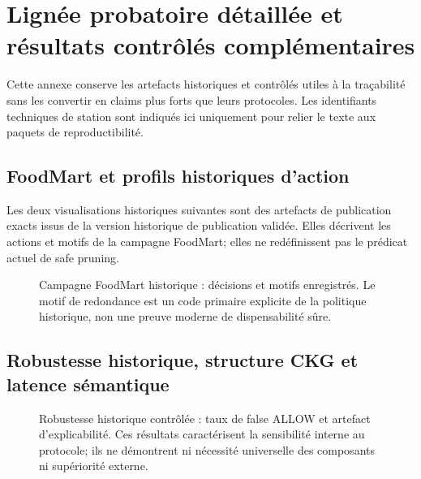 \section{Lignée probatoire détaillée et résultats contrôlés complémentaires}
\label{app:evidence-lineage}

Cette annexe conserve les artefacts historiques et contrôlés utiles à la traçabilité sans les convertir en claims plus forts que leurs protocoles. Les identifiants techniques de station sont indiqués ici uniquement pour relier le texte aux paquets de reproductibilité.

\subsection{FoodMart et profils historiques d'action}

Les deux visualisations historiques suivantes sont des artefacts de publication exacts issus de la version historique de publication validée. Elles décrivent les actions et motifs de la campagne FoodMart; elles ne redéfinissent pas le prédicat actuel de safe pruning.

\begin{figure}[!t]
\centering
\begin{minipage}[t]{0.48\textwidth}\centering\end{minipage}\hfill
\begin{minipage}[t]{0.48\textwidth}\centering\end{minipage}
\caption{Campagne FoodMart historique : décisions et motifs enregistrés. Le motif de redondance est un code primaire explicite de la politique historique, non une preuve moderne de dispensabilité sûre.}
\label{fig:legacy-foodmart}
\end{figure}




\subsection{Robustesse historique, structure CKG et latence sémantique}

\begin{figure}[!t]
\centering
\begin{minipage}[t]{0.48\textwidth}\centering\end{minipage}\hfill
\begin{minipage}[t]{0.48\textwidth}\centering\end{minipage}
\caption{Robustesse historique contrôlée : taux de false ALLOW et artefact d'explicabilité. Ces résultats caractérisent la sensibilité interne au protocole; ils ne démontrent ni nécessité universelle des composants ni supériorité externe.}
\label{fig:legacy-robustness-detail}
\end{figure}

